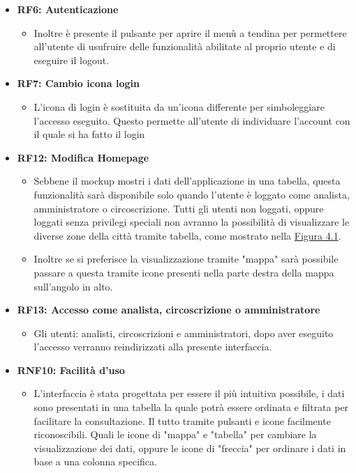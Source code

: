     \begin{itemize}
        \item \textbf{RF6: Autenticazione} \begin{itemize} 
            \item Inoltre è presente il pulsante per aprire il menù a tendina per permettere all'utente di usufruire delle funzionalità abilitate al proprio utente e di eseguire il logout.
        \end{itemize}
        \item \textbf{RF7: Cambio icona login} \begin{itemize} 
            \item L'icona di login è sostituita da un'icona differente per simboleggiare l'accesso eseguito. Questo permette all'utente di individuare l'account con il quale si ha fatto il login
        \end{itemize}
        \item \textbf{RF12: Modifica Homepage} \begin{itemize}
            \item Sebbene il mockup mostri i dati dell'applicazione in una tabella, questa funzionalità sarà disponibile solo quando l'utente è loggato come analista, amministratore o circoscrizione. Tutti gli utenti non loggati, oppure loggati senza privilegi speciali non avranno la possibilità di visualizzare le diverse zone della città tramite tabella, come mostrato nella \hyperref[fig:4.1]{Figura 4.1}.
            \item Inoltre se si preferisce la visualizzazione tramite "mappa" sarà possibile passare a questa tramite icone presenti nella parte destra della mappa sull'angolo in alto. 
        \end{itemize}
        \item \textbf{RF13: Accesso come analista, circoscrizione o amministratore} \begin{itemize}
            \item Gli utenti: analisti, circoscrizioni e amministratori, dopo aver eseguito l'accesso verranno reindirizzati alla presente interfaccia.
        \end{itemize}
        \item \textbf{RNF10: Facilità d'uso} \begin{itemize}
            \item L'interfaccia è stata progettata per essere il più intuitiva possibile, i dati sono presentati in una tabella la quale potrà essere ordinata e filtrata per facilitare la consultazione. Il tutto tramite pulsanti e icone facilmente riconoscibili. Quali le icone di "mappa" e "tabella" per cambiare la visualizzazione dei dati, oppure le icone di "freccia" per ordinare i dati in base a una colonna specifica.

\end{itemize}
\end{itemize}
